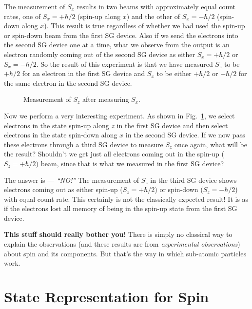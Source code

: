 The measurement of $S_x$ results in two beams with approximately equal
count rates, one of $S_x = +\hbar/2$ (spin-up along $x$) and the other of
$S_x = -\hbar/2$ (spin-down along $x$).  This result is true regardless
of whether we had used the spin-up or spin-down beam from the first SG
device.  Also if we send the electrons into the second SG device one at a
time, what we observe from the output is an electron randomly coming out
of the second SG device as either $S_x = +\hbar/2$ or $S_x = -\hbar/2$.
So the result of this experiment is that we have measured $S_z$ to be
$+\hbar/2$ for an electron in the first SG device and $S_x$ to be either
$+\hbar/2$ or $-\hbar/2$ for the same electron in the second SG device.

\begin{figure}[b]
\begin{center}
\caption{Measurement of $S_z$ after measuring $S_x$.}
\label{fig:SGDevice4}
\end{center}
\end{figure}

Now we perform a very interesting experiment.  As shown in
Fig.~\ref{fig:SGDevice4}, we select electrons in the state spin-up
along $z$ in the first SG device and then select electrons in the state
spin-down along $x$ in the second SG device.  If we now pass these
electrons through a third SG device to measure $S_z$ once again, what
will be the result?  Shouldn't we get just all electrons coming out in
the spin-up ($S_z = +\hbar/2$) beam, since that is what we measured in
the first SG device?

The answer is --- {\it ``NO!''\/}  The measurement of $S_z$ in the third
SG device shows electrons coming out as either spin-up ($S_z = +\hbar/2$)
or spin-down ($S_z = -\hbar/2$) with equal count rate.  This certainly
is not the classically expected result!  It is as if the electrons lost
all memory of being in the spin-up state from the first SG device.

{\bf This stuff should really bother you!}  There is simply no
classical way to explain the observations (and these results are from
{\it experimental observations\/}) about spin and its components.
But that's the way in which sub-atomic particles work.



\section{State Representation for Spin}
\label{sec:spin_representation}

